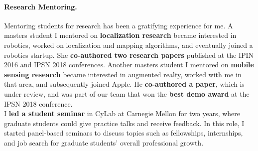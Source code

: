 \documentclass[10pt]{article}
\begin{document}
\paragraph{Research Mentoring. }
Mentoring students for research has been a gratifying experience for me. 
 A masters student I mentored on \textbf{localization research} became interested in robotics, worked on localization and mapping algorithms,  and eventually joined a robotics startup. She \textbf{co-authored two research papers} published at the IPIN 2016 and IPSN 2018 conferences.
Another masters student I mentored on \textbf{mobile sensing research} became interested in augmented realty, worked with me in that area, and subsequently joined Apple. He \textbf{co-authored a paper}, which is under review, and was part of our team that won the \textbf{best demo award} at the IPSN 2018 conference.\\ %

I \textbf{led a student seminar} in CyLab at Carnegie Mellon for two years, where graduate students could give practice talks and receive feedback. In this role, I started panel-based seminars to discuss topics such as fellowships, internships, and job search for graduate students' overall professional growth.  
\end{document}
